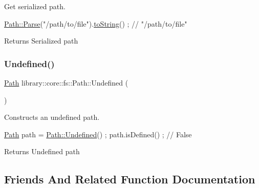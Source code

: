Get serialized path. 


\begin{DoxyCode}
\hyperlink{classlibrary_1_1core_1_1fs_1_1_path_a6ba644b6609507e724c217bf2020f5ae}{Path::Parse}(\textcolor{stringliteral}{"/path/to/file"}).\hyperlink{classlibrary_1_1core_1_1fs_1_1_path_a6f78df53d8e604dd9e1b43e23311724a}{toString}() ; \textcolor{comment}{// "/path/to/file"}
\end{DoxyCode}


\begin{DoxyReturn}{Returns}
Serialized path 
\end{DoxyReturn}
\mbox{\label{classlibrary_1_1core_1_1fs_1_1_path_a0bb46bc56bc1bb180b114bae32477e06}} 
\subsubsection{\texorpdfstring{Undefined()}{Undefined()}}
{\footnotesize\ttfamily \hyperlink{classlibrary_1_1core_1_1fs_1_1_path}{Path} library\+::core\+::fs\+::\+Path\+::\+Undefined (\begin{DoxyParamCaption}{ }\end{DoxyParamCaption})\hspace{0.3cm}{\ttfamily [static]}}



Constructs an undefined path. 


\begin{DoxyCode}
\hyperlink{classlibrary_1_1core_1_1fs_1_1_path_aabc4240fc08479d1bff6b9753f2b5cc2}{Path} path = \hyperlink{classlibrary_1_1core_1_1fs_1_1_path_a0bb46bc56bc1bb180b114bae32477e06}{Path::Undefined}() ;
path.isDefined() ; \textcolor{comment}{// False}
\end{DoxyCode}


\begin{DoxyReturn}{Returns}
Undefined path 
\end{DoxyReturn}


\subsection{Friends And Related Function Documentation}
\mbox{\label{classlibrary_1_1core_1_1fs_1_1_path_a87813ac3ede0b43b50ae6b9fdf0a2815}} 
